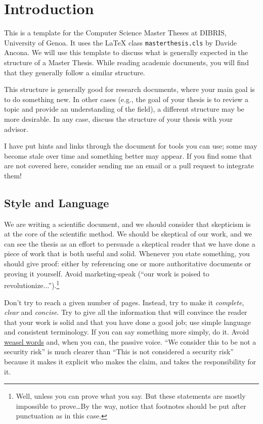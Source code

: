 \chapter{Introduction}
\label{sec:introduction}

This is a template for the Computer Science Master Theses at DIBRIS,
University of Genoa. It uses the \xspace{\LaTeX} class \texttt{masterthesis.cls} by
Davide Ancona. We will use this template to discuss what is generally expected in the
structure of a Master Thesis. While reading academic documents, you will find that
they generally follow a similar structure.

This structure is generally good for research documents, where your main goal is to do
something new. In other cases (e.g., the goal of your thesis is to review a topic and provide
an understanding of the field), a different structure may be more desirable. In any case,
discuss the structure of your thesis with your advisor.

I have put hints and links through the document for tools you can use; some may become stale over time and something better may appear. If you find some that are not covered here, consider sending me an email or a pull request to integrate them!

\section{Style and Language}

We are writing a scientific document, and we should consider that skepticism
is at the core of the scientific method. We should be skeptical of our work, and
we can see the thesis as an effort to persuade a skeptical reader that we have done
a piece of work that is both useful and solid. Whenever you state something, you should give proof:
either by referencing one or more authoritative documents or proving it yourself.
Avoid marketing-speak (``our work is poised to revolutionize...'').\footnote{Well, unless you can
prove what you say. But these statements are mostly impossible to prove\ldots By the
way, notice that footnotes should be put after punctuation as in this case.}

Don't try to reach a given number of pages. Instead, try to make it
\emph{complete}, \emph{clear} and \emph{concise}. Try to give all the information that will
convince the reader that your work is solid and that you have done a good job; use simple
language and consistent terminology.
If you can say something more simply, do it. Avoid
\href{https://en.wikipedia.org/wiki/Weasel_word}{weasel words} and, when you can, the passive voice.
``We consider this to be not a security risk'' is much clearer than ``This is not considered a
security risk'' because it makes it explicit who makes the claim, and takes the responsibility for
it.

